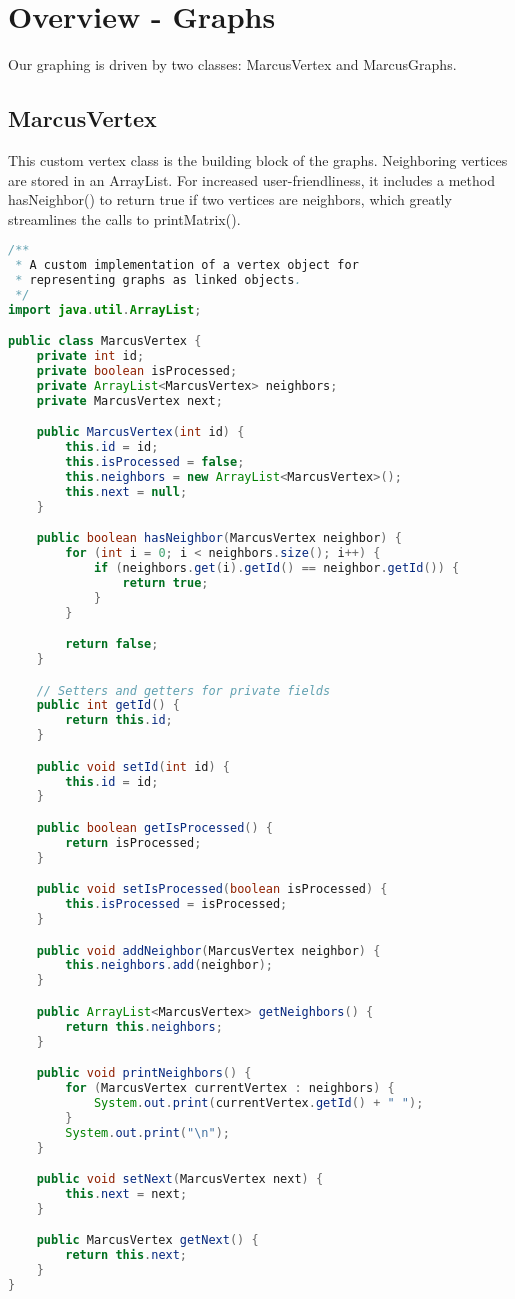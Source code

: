 \documentclass[letterpaper, 10pt]{article}
\begin{document}
\section{Overview - Graphs}

\hspace{1.0em}Our graphing is driven by two classes: MarcusVertex and MarcusGraphs.

\subsection{MarcusVertex}

\hspace{1.0em}This custom vertex class is the building block of the graphs. Neighboring vertices are stored in an ArrayList. For increased user-friendliness, it includes a method hasNeighbor() to return true if two vertices are neighbors, which greatly streamlines the calls to printMatrix().

\begin{lstlisting}[language=Java, firstnumber=1]
/**
 * A custom implementation of a vertex object for
 * representing graphs as linked objects.
 */
import java.util.ArrayList;

public class MarcusVertex {
    private int id;
    private boolean isProcessed;
    private ArrayList<MarcusVertex> neighbors;
    private MarcusVertex next;

    public MarcusVertex(int id) {
        this.id = id;
        this.isProcessed = false;
        this.neighbors = new ArrayList<MarcusVertex>();
        this.next = null;
    }

    public boolean hasNeighbor(MarcusVertex neighbor) {
        for (int i = 0; i < neighbors.size(); i++) {
            if (neighbors.get(i).getId() == neighbor.getId()) {
                return true;
            }
        }

        return false;
    }

    // Setters and getters for private fields
    public int getId() {
        return this.id;
    }

    public void setId(int id) {
        this.id = id;
    }

    public boolean getIsProcessed() {
        return isProcessed;
    }

    public void setIsProcessed(boolean isProcessed) {
        this.isProcessed = isProcessed;
    }

    public void addNeighbor(MarcusVertex neighbor) {
        this.neighbors.add(neighbor);
    }

    public ArrayList<MarcusVertex> getNeighbors() {
        return this.neighbors;
    }

    public void printNeighbors() {
        for (MarcusVertex currentVertex : neighbors) {
            System.out.print(currentVertex.getId() + " ");
        }
        System.out.print("\n");
    }

    public void setNext(MarcusVertex next) {
        this.next = next;
    }

    public MarcusVertex getNext() {
        return this.next;
    }
}

\end{lstlisting}
\end{document}
